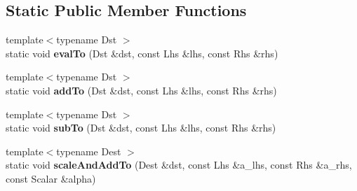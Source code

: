 \subsection*{Static Public Member Functions}
\begin{DoxyCompactItemize}
\item 
\mbox{\label{struct_eigen_1_1internal_1_1generic__product__impl_3_01_lhs_00_01_rhs_00_01_dense_shape_00_01_def53e16cb724bbb32f6918835a9970bd5_aa89f104fd9e52d048200c7322f36da62}} 
{\footnotesize template$<$typename Dst $>$ }\\static void {\bfseries eval\+To} (Dst \&dst, const Lhs \&lhs, const Rhs \&rhs)
\item 
\mbox{\label{struct_eigen_1_1internal_1_1generic__product__impl_3_01_lhs_00_01_rhs_00_01_dense_shape_00_01_def53e16cb724bbb32f6918835a9970bd5_ac90997f3a150d53a3574604ca61403de}} 
{\footnotesize template$<$typename Dst $>$ }\\static void {\bfseries add\+To} (Dst \&dst, const Lhs \&lhs, const Rhs \&rhs)
\item 
\mbox{\label{struct_eigen_1_1internal_1_1generic__product__impl_3_01_lhs_00_01_rhs_00_01_dense_shape_00_01_def53e16cb724bbb32f6918835a9970bd5_a4ab7938d01c375e504756856e8cd9544}} 
{\footnotesize template$<$typename Dst $>$ }\\static void {\bfseries sub\+To} (Dst \&dst, const Lhs \&lhs, const Rhs \&rhs)
\item 
\mbox{\label{struct_eigen_1_1internal_1_1generic__product__impl_3_01_lhs_00_01_rhs_00_01_dense_shape_00_01_def53e16cb724bbb32f6918835a9970bd5_afdc6730448aab0a09ace45e90ae31634}} 
{\footnotesize template$<$typename Dest $>$ }\\static void {\bfseries scale\+And\+Add\+To} (Dest \&dst, const Lhs \&a\+\_\+lhs, const Rhs \&a\+\_\+rhs, const Scalar \&alpha)
\item 

\end{DoxyCompactItemize}
